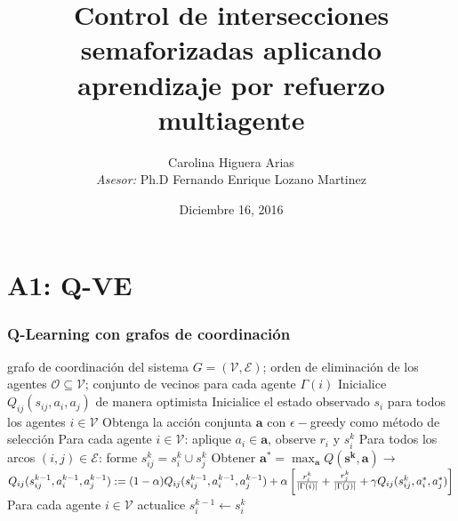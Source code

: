 \documentclass[11pt]{beamer}
\author[Carolina Higuera Arias]{Carolina Higuera Arias\\ \bigskip \textit{Asesor:} Ph.D Fernando Enrique Lozano Martinez}
\title[Control de tránsito con MARL]{Control de intersecciones semaforizadas aplicando aprendizaje por refuerzo multiagente}
\institute[Uniandes] 
{
Universidad de los Andes \\ 
\medskip
}
\date{Diciembre 16, 2016}
\begin{document}
\section{A1: Q-VE}
\begin{frame}
\frametitle{Q-Learning con grafos de coordinación}

\scriptsize
\begin{algorithmic}[1]
\Require grafo de coordinación del sistema $G=(\mathcal{V},\mathcal{E})$; orden de eliminación de los agentes $\mathcal{O}\subseteq \mathcal{V}$; conjunto de vecinos para cada agente $\Gamma(i)$
	\State Inicialice $Q_{ij}(s_{ij},a_i,a_j)$ de manera optimista
\EndFor
{}
	\State Inicialice el estado observado $s_i$ para todos los agentes $i \in \mathcal{V}$
		\State Obtenga la acción conjunta $\mathbf{a}$ con $\epsilon-$greedy como método de selección 
		\State Para cada agente $i \in \mathcal{V}$: aplique $a_i \in \mathbf{a}$, observe $r_i$ y $s_i^k$
		\State Para todos los arcos $(i,j) \in \mathcal{E}$: forme $s_{ij}^k=s_i^k \cup s_j^k$
		\State Obtener $\mathbf{a}^*=\max_{\mathbf{a}}Q(\mathbf{s^k},\mathbf{a}) \rightarrow$ 
			\State \tiny $Q_{ij}(s_{ij}^{k-1},a_i^{k-1},a_j^{k-1}):= (1-\alpha)Q_{ij}(s_{ij}^{k-1},a_i^{k-1},a_j^{k-1})+ \alpha \left[ \frac{r_i^k}{|\Gamma(i)|}+\frac{r_j^k}{|\Gamma(j)|}+ \gamma Q_{ij}(s_{ij}^k,a_i^*,a_j^*) {\vphantom{\frac{r_i}{|\Gamma(i)|}}} \right]$ \scriptsize
		\EndFor
		\State Para cada agente $i \in \mathcal{V}$ actualice $s_i^{k-1} \leftarrow s_i^k$
	\EndFor
\EndFor
\end{algorithmic}
\end{frame}
\end{document}
